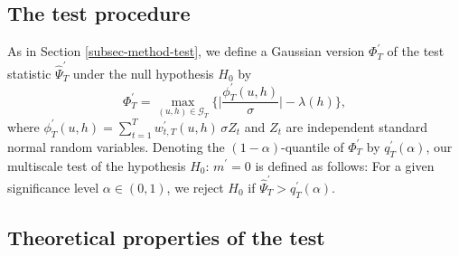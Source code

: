 \subsection{The test procedure}\label{subsec-test-shape-test}


As in Section \ref{subsec-method-test}, we define a Gaussian version $\Phi_T^\prime$ of the test statistic $\widehat{\Psi}_T^\prime$ under the null hypothesis $H_0$ by
\[ \Phi_T^\prime = \max_{(u,h) \in \mathcal{G}_T} \Big\{ \Big|\frac{\phi_T^\prime(u,h)}{\sigma}\Big| - \lambda(h) \Big\}, \] 
where $\phi_T^\prime(u,h) = \sum\nolimits_{t=1}^T w_{t,T}^\prime(u,h) \, \sigma Z_t$ and $Z_t$ are independent standard normal random variables. Denoting the $(1-\alpha)$-quantile of $\Phi_T^\prime$ by $q_T^\prime(\alpha)$, our multiscale test of the hypothesis $H_0$: $m^\prime = 0$ is defined as follows: For a given significance level $\alpha \in (0,1)$, we reject $H_0$ if $\widehat{\Psi}_T^\prime > q_T^\prime(\alpha)$. 


\subsection{Theoretical properties of the test}\label{subsec-test-shape-theo}


